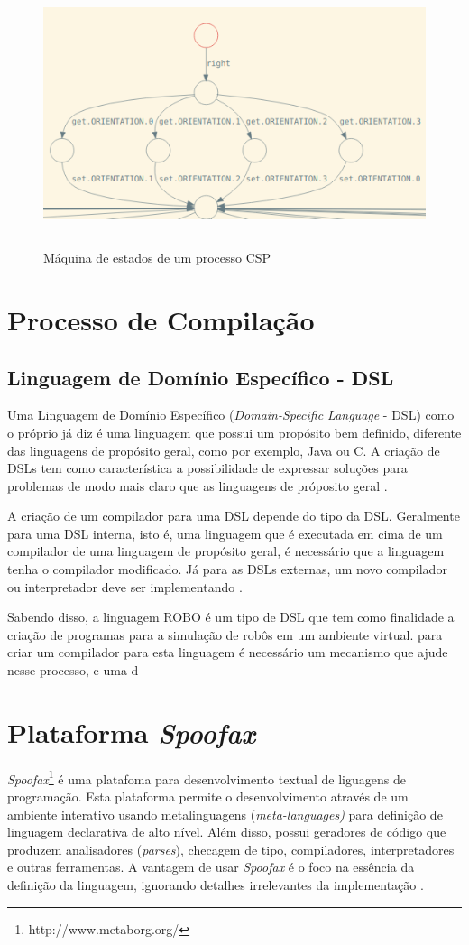 \begin{figure}[h]
\centering
\caption{Máquina de estados de um processo CSP}
\includegraphics[height=7cm]{figuras/graph.png}
\label{fig:graph}
\end{figure}

\section{Processo de Compilação}

\subsection{Linguagem de Domínio Específico - DSL}
Uma Linguagem de Domínio Específico (\textit{Domain-Specific Language} - DSL) como o próprio já diz é uma linguagem que possui um propósito bem definido, diferente das linguagens de propósito geral, como por exemplo, Java ou C. A criação de DSLs tem como característica a possibilidade de expressar soluções para problemas de modo mais claro que as linguagens de próposito geral \cite{fowler}.

A criação de um compilador para uma DSL depende do tipo da DSL. Geralmente para uma DSL interna, isto é, uma linguagem que é executada em cima de um compilador de uma linguagem de propósito geral, é necessário que a linguagem tenha o compilador modificado. Já para as DSLs externas, um novo compilador ou interpretador deve ser implementando \cite{schimitt}.

Sabendo disso, a linguagem ROBO é um tipo de DSL que tem como finalidade a criação de programas para a simulação de robôs em um ambiente virtual. para criar um compilador para esta linguagem é necessário um mecanismo que ajude nesse processo, e uma d

\section{Plataforma \textit{Spoofax}}
\textit{Spoofax}\footnote[6]{http://www.metaborg.org/} é uma platafoma para desenvolvimento textual de liguagens de programação. Esta plataforma permite o desenvolvimento através de um ambiente interativo usando metalinguagens (\textit{meta-languages)} para definição de linguagem declarativa de alto nível. Além disso, possui geradores de código que produzem analisadores (\textit{parses}), checagem de tipo, compiladores, interpretadores e outras ferramentas. A vantagem de usar \textit{Spoofax} é o foco na essência da definição da linguagem, ignorando detalhes irrelevantes da implementação \cite{KatsSpoofax}.

